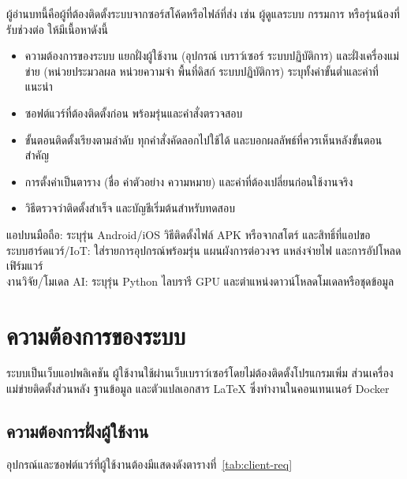 \label{ch:install}

\begin{guide}
ผู้อ่านบทนี้คือผู้ที่ต้องติดตั้งระบบจากซอร์สโค้ดหรือไฟล์ที่ส่ง เช่น ผู้ดูแลระบบ กรรมการ
หรือรุ่นน้องที่รับช่วงต่อ ให้มีเนื้อหาดังนี้
\begin{itemize}
  \item ความต้องการของระบบ แยกฝั่งผู้ใช้งาน (อุปกรณ์ เบราว์เซอร์ ระบบปฏิบัติการ)
        และฝั่งเครื่องแม่ข่าย (หน่วยประมวลผล หน่วยความจำ พื้นที่ดิสก์ ระบบปฏิบัติการ)
        ระบุทั้งค่าขั้นต่ำและค่าที่แนะนำ
  \item ซอฟต์แวร์ที่ต้องติดตั้งก่อน พร้อมรุ่นและคำสั่งตรวจสอบ
  \item ขั้นตอนติดตั้งเรียงตามลำดับ ทุกคำสั่งคัดลอกไปใช้ได้ และบอกผลลัพธ์ที่ควรเห็นหลังขั้นตอนสำคัญ
  \item การตั้งค่าเป็นตาราง (ชื่อ ค่าตัวอย่าง ความหมาย) และค่าที่ต้องเปลี่ยนก่อนใช้งานจริง
  \item วิธีตรวจว่าติดตั้งสำเร็จ และบัญชีเริ่มต้นสำหรับทดสอบ
\end{itemize}
แอปบนมือถือ: ระบุรุ่น Android/iOS วิธีติดตั้งไฟล์ APK หรือจากสโตร์ และสิทธิ์ที่แอปขอ \\
ระบบฮาร์ดแวร์/IoT: ใส่รายการอุปกรณ์พร้อมรุ่น แผนผังการต่อวงจร แหล่งจ่ายไฟ และการอัปโหลดเฟิร์มแวร์ \\
งานวิจัย/โมเดล AI: ระบุรุ่น Python ไลบรารี GPU และตำแหน่งดาวน์โหลดโมเดลหรือชุดข้อมูล
\end{guide}

\section{ความต้องการของระบบ}
\label{sec:requirements}

ระบบเป็นเว็บแอปพลิเคชัน ผู้ใช้งานใช้ผ่านเว็บเบราว์เซอร์โดยไม่ต้องติดตั้งโปรแกรมเพิ่ม
ส่วนเครื่องแม่ข่ายติดตั้งส่วนหลัง ฐานข้อมูล และตัวแปลเอกสาร \LaTeX{} ซึ่งทำงานในคอนเทนเนอร์ Docker

\subsection{ความต้องการฝั่งผู้ใช้งาน}

อุปกรณ์และซอฟต์แวร์ที่ผู้ใช้งานต้องมีแสดงดังตารางที่~\ref{tab:client-req}


